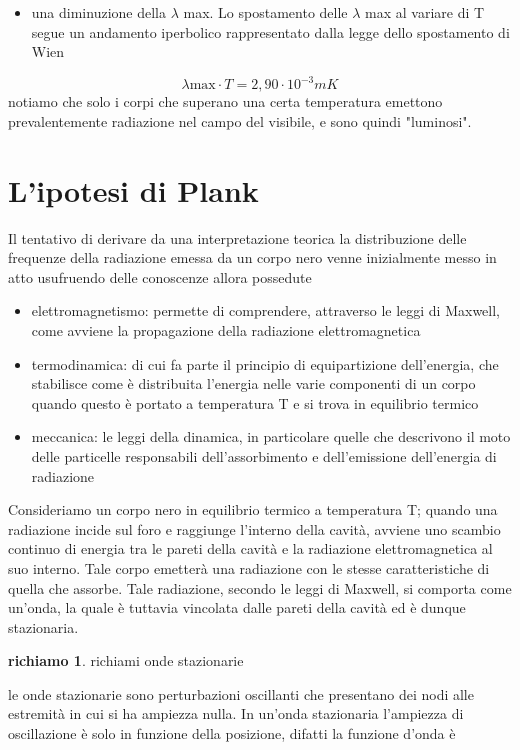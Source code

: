 \documentclass{article}
\theoremstyle{definition}
\newtheorem{richi}{richiamo}[section]
\begin{document}
\begin{itemize}
\item una diminuzione della \(\lambda\) max. Lo spostamento delle \(\lambda\) max al variare di T segue un andamento iperbolico rappresentato dalla legge dello spostamento di Wien
\end{itemize}
\begin{equation}
\lambda \text{max}\cdot T = 2,90\cdot 10^{-3}mK
\end{equation}
notiamo che solo i corpi che superano una certa temperatura emettono prevalentemente radiazione nel campo del visibile, e sono quindi "luminosi".
\section*{L'ipotesi di Plank}
Il tentativo di derivare da una interpretazione teorica la distribuzione delle frequenze della radiazione emessa da un corpo nero venne inizialmente messo in atto usufruendo delle conoscenze allora possedute 
\begin{itemize}
\item elettromagnetismo: permette di comprendere, attraverso le leggi di Maxwell, come avviene la propagazione della radiazione elettromagnetica
\item termodinamica: di cui fa parte il principio di equipartizione dell'energia, che stabilisce come è distribuita l'energia nelle varie componenti di un corpo quando questo è portato a temperatura T e si trova in equilibrio termico
\item meccanica: le leggi della dinamica, in particolare quelle che descrivono il moto delle particelle responsabili dell'assorbimento e dell'emissione dell'energia di radiazione
\end{itemize}
Consideriamo un corpo nero in equilibrio termico a temperatura T; quando una radiazione incide sul foro e raggiunge l'interno della cavità, avviene uno scambio continuo di energia tra le pareti della cavità e la radiazione elettromagnetica al suo interno. Tale corpo emetterà una radiazione con le stesse caratteristiche di quella che assorbe. Tale radiazione, secondo le leggi di Maxwell, si comporta come un'onda, la quale è tuttavia vincolata dalle pareti della cavità ed è dunque stazionaria.
\begin{richi}{richiami onde stazionarie}

\par le onde stazionarie sono perturbazioni oscillanti che presentano dei nodi alle estremità in cui si ha ampiezza nulla. In un'onda stazionaria l'ampiezza di oscillazione è solo in funzione della posizione, difatti la funzione d'onda è 
\end{richi}
\end{document}

